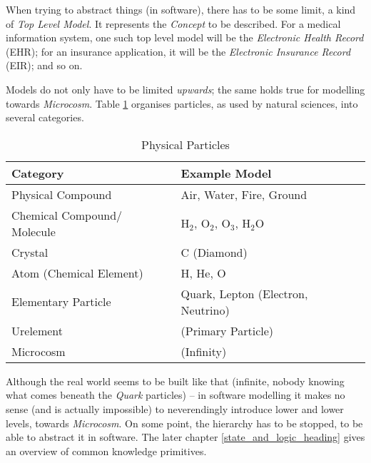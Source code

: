 When trying to abstract things (in software), there has to be some limit, a
kind of \emph{Top Level Model}. It represents the \emph{Concept} to be
described. For a medical information system, one such top level model will be
the \emph{Electronic Health Record} (EHR); for an insurance application, it
will be the \emph{Electronic Insurance Record} (EIR); and so on.

Models do not only have to be limited \emph{upwards}; the same holds true for
modelling towards \emph{Microcosm}. Table \ref{physical_table} organises
particles, as used by natural sciences, into several categories.

\begin{table}[ht]
    \begin{center}
        \begin{footnotesize}
        \begin{tabular}{| p{50mm} | p{55mm} |}
            \hline
            \textbf{Category} & \textbf{Example Model}\\
            \hline
            Physical Compound & Air, Water, Fire, Ground\\
            \hline
            Chemical Compound/ Molecule & H$_{2}$, O$_{2}$, O$_{3}$, H$_{2}$O\\
            \hline
            Crystal & C (Diamond)\\
            \hline
            Atom (Chemical Element) & H, He, O\\
            \hline
            Elementary Particle & Quark, Lepton (Electron, Neutrino)\\
            \hline
            Urelement & (Primary Particle)\\
            \hline
            Microcosm & (Infinity)\\
            \hline
        \end{tabular}
        \end{footnotesize}
        \caption{Physical Particles}
        \label{physical_table}
    \end{center}
\end{table}

Although the real world seems to be built like that (infinite, nobody knowing
what comes beneath the \emph{Quark} particles) -- in software modelling it
makes no sense (and is actually impossible) to neverendingly introduce lower
and lower levels, towards \emph{Microcosm}. On some point, the hierarchy has to
be stopped, to be able to abstract it in software. The later chapter
\ref{state_and_logic_heading} gives an overview of common knowledge primitives.
